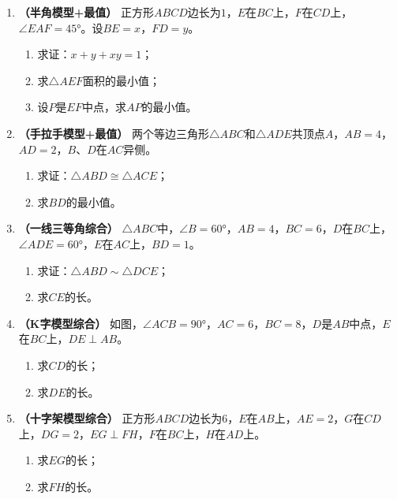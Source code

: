 \documentclass[12pt, a4paper]{ctexart}
\begin{document}
\begin{enumerate}[label=\textbf{【题\arabic*】}, leftmargin=2em]

\item \textbf{（半角模型+最值）}
正方形$ABCD$边长为$1$，$E$在$BC$上，$F$在$CD$上，$\angle EAF = 45°$。设$BE = x$，$FD = y$。
\begin{enumerate}[label=(\arabic*)]
  \item 求证：$x + y + xy = 1$；
  \item 求$\triangle AEF$面积的最小值；
  \item 设$P$是$EF$中点，求$AP$的最小值。
\end{enumerate}

\item \textbf{（手拉手模型+最值）}
两个等边三角形$\triangle ABC$和$\triangle ADE$共顶点$A$，$AB = 4$，$AD = 2$，$B$、$D$在$AC$异侧。
\begin{enumerate}[label=(\arabic*)]
  \item 求证：$\triangle ABD \cong \triangle ACE$；
  \item 求$BD$的最小值。
\end{enumerate}

\item \textbf{（一线三等角综合）}
$\triangle ABC$中，$\angle B = 60°$，$AB = 4$，$BC = 6$，$D$在$BC$上，$\angle ADE = 60°$，$E$在$AC$上，$BD = 1$。
\begin{enumerate}[label=(\arabic*)]
  \item 求证：$\triangle ABD \sim \triangle DCE$；
  \item 求$CE$的长。
\end{enumerate}

\item \textbf{（K字模型综合）}
如图，$\angle ACB = 90°$，$AC = 6$，$BC = 8$，$D$是$AB$中点，$E$在$BC$上，$DE \perp AB$。
\begin{enumerate}[label=(\arabic*)]
  \item 求$CD$的长；
  \item 求$DE$的长。
\end{enumerate}

\item \textbf{（十字架模型综合）}
正方形$ABCD$边长为$6$，$E$在$AB$上，$AE = 2$，$G$在$CD$上，$DG = 2$，$EG \perp FH$，$F$在$BC$上，$H$在$AD$上。
\begin{enumerate}[label=(\arabic*)]
  \item 求$EG$的长；
  \item 求$FH$的长。
\end{enumerate}


\end{enumerate}
\end{document}
